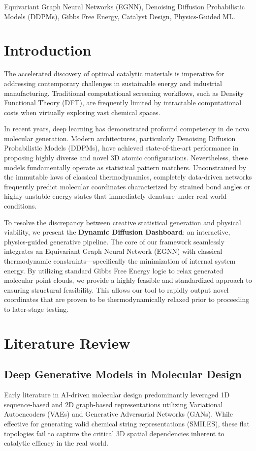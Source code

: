 \documentclass[conference]{IEEEtran}
\begin{document}
\begin{IEEEkeywords}
Equivariant Graph Neural Networks (EGNN), Denoising Diffusion Probabilistic Models (DDPMs), Gibbs Free Energy, Catalyst Design, Physics-Guided ML.
\end{IEEEkeywords}

\section{Introduction}

The accelerated discovery of optimal catalytic materials is imperative for addressing contemporary challenges in sustainable energy and industrial manufacturing. Traditional computational screening workflows, such as Density Functional Theory (DFT), are frequently limited by intractable computational costs when virtually exploring vast chemical spaces. 

In recent years, deep learning has demonstrated profound competency in de novo molecular generation. Modern architectures, particularly Denoising Diffusion Probabilistic Models (DDPMs), have achieved state-of-the-art performance in proposing highly diverse and novel 3D atomic configurations. Nevertheless, these models fundamentally operate as statistical pattern matchers. Unconstrained by the immutable laws of classical thermodynamics, completely data-driven networks frequently predict molecular coordinates characterized by strained bond angles or highly unstable energy states that immediately denature under real-world conditions.

To resolve the discrepancy between creative statistical generation and physical viability, we present the \textbf{Dynamic Diffusion Dashboard}: an interactive, physics-guided generative pipeline. The core of our framework seamlessly integrates an Equivariant Graph Neural Network (EGNN) with classical thermodynamic constraints---specifically the minimization of internal system energy. By utilizing standard Gibbs Free Energy logic to relax generated molecular point clouds, we provide a highly feasible and standardized approach to ensuring structural feasibility. This allows our tool to rapidly output novel coordinates that are proven to be thermodynamically relaxed prior to proceeding to later-stage testing. 

\section{Literature Review}

\subsection{Deep Generative Models in Molecular Design}
Early literature in AI-driven molecular design predominantly leveraged 1D sequence-based and 2D graph-based representations utilizing Variational Autoencoders (VAEs) and Generative Adversarial Networks (GANs). While effective for generating valid chemical string representations (SMILES), these flat topologies fail to capture the critical 3D spatial dependencies inherent to catalytic efficacy in the real world.
\end{document}

